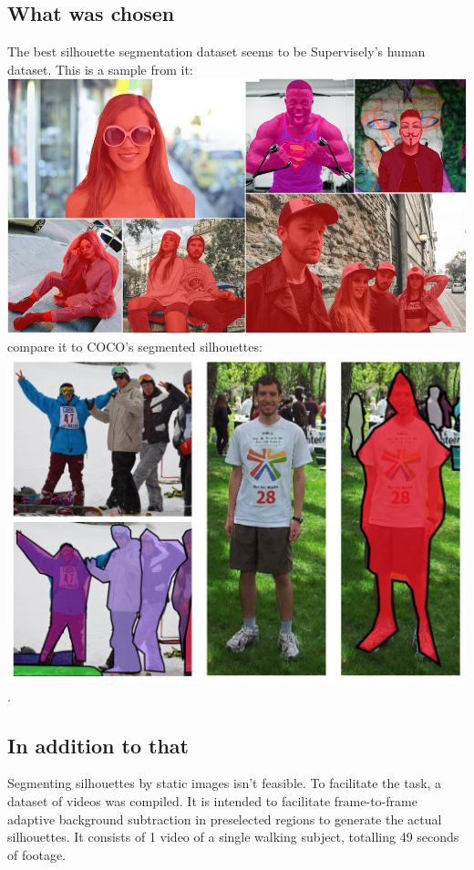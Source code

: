 \documentclass{article}
\begin{document}
\subsection{What was chosen}
The best silhouette segmentation dataset seems to be Supervisely's human dataset\cite{supervisely}. This is a sample from it:
\\
\includegraphics[height=0.5\textwidth]{../img/supervisely}
\\
compare it to COCO's segmented silhouettes:
\\
\includegraphics[height=0.5\textheight]{../img/coco}.

\subsection{In addition to that}
Segmenting silhouettes by static images isn't feasible.
To facilitate the task, a dataset of videos was compiled.
It is intended to facilitate frame-to-frame adaptive background subtraction in preselected regions to generate the actual silhouettes.
It consists of 1 video of a single walking subject, totalling 49 seconds of footage.
\end{document}
